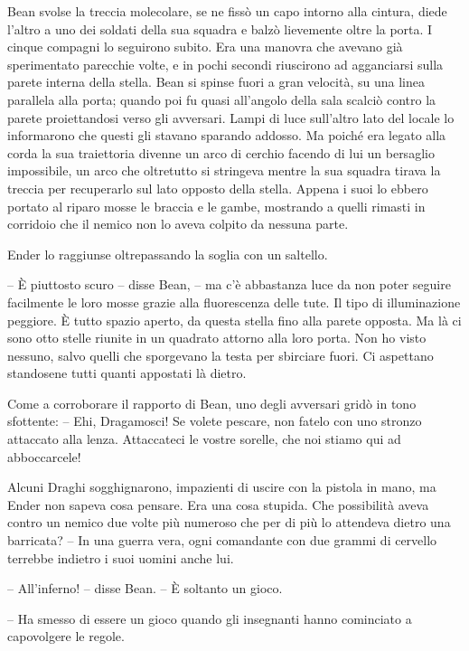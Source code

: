 {Bean svolse la treccia molecolare, se ne fissò un capo intorno alla
	cintura, diede l'altro a uno dei soldati della sua squadra e balzò
	lievemente oltre la porta. I cinque compagni lo seguirono subito. Era
	una manovra che avevano già sperimentato parecchie volte, e in pochi
	secondi riuscirono ad agganciarsi sulla parete interna della stella.
	Bean si spinse fuori a gran velocità, su una linea parallela alla porta;
	quando poi fu quasi all'angolo della sala scalciò contro la parete
	proiettandosi verso gli avversari. Lampi di luce sull'altro lato del
	locale lo informarono che questi gli stavano sparando addosso. Ma poiché
	era legato alla corda la sua traiettoria divenne un arco di cerchio
	facendo di lui un bersaglio impossibile, un arco che oltretutto si
	stringeva mentre la sua squadra tirava la treccia per recuperarlo sul
	lato opposto della stella. Appena i suoi lo ebbero portato al riparo
	mosse le braccia e le gambe, mostrando a quelli rimasti in corridoio che
	il nemico non lo aveva colpito da nessuna parte.}

{Ender lo raggiunse oltrepassando la soglia con un saltello.}

{-- È piuttosto scuro -- disse Bean, -- ma c'è abbastanza luce da non
	poter seguire facilmente le loro mosse grazie alla fluorescenza delle
	tute. Il tipo di illuminazione peggiore. È tutto spazio aperto, da
	questa stella fino alla parete opposta. Ma là ci sono otto stelle
	riunite in un quadrato attorno alla loro porta. Non ho visto nessuno,
	salvo quelli che sporgevano la testa per sbirciare fuori. Ci aspettano
	standosene tutti quanti appostati là dietro.}

{Come a corroborare il rapporto di Bean, uno degli avversari gridò in
	tono sfottente: -- Ehi, Dragamosci! Se volete pescare, non fatelo con
	uno stronzo attaccato alla lenza. Attaccateci le vostre sorelle, che noi
	stiamo qui ad abboccarcele!}

{Alcuni Draghi sogghignarono, impazienti di uscire con la pistola in
	mano, ma Ender non sapeva cosa pensare. Era una cosa stupida. Che
	possibilità aveva contro un nemico due volte più numeroso che per di più
	lo attendeva dietro una barricata? -- In una guerra vera, ogni
	comandante con due grammi di cervello terrebbe indietro i suoi uomini
	anche lui.}

{-- All'inferno! -- disse Bean. -- È soltanto un gioco.}

{-- Ha smesso di essere un gioco quando gli insegnanti hanno cominciato
	a capovolgere le regole.}


